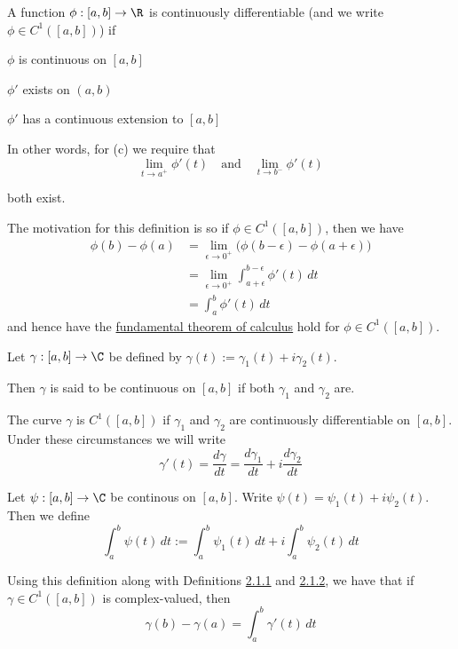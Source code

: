 \label{c1f6d35}

A function $\phi:[a,b]\to\R$ is continuously differentiable
(and we write $\phi\in C^1([a,b])$) if

\begin{enumerata}
	\item $\phi$ is continuous on $[a,b]$
	\item $\phi'$ exists on $(a,b)$
	\item $\phi'$ has a continuous extension to $[a,b]$
\end{enumerata}

In other words, for (c) we require that
$$
	\lim_{t\to a^+}\phi'(t)\quad\text{and}\quad\lim_{t\to b^-}\phi'(t)
$$

both exist.

The motivation for this definition is so if $\phi\in C^1([a,b])$, then
we have
\begin{align}
	\phi(b)-\phi(a)
	 & =\lim_{\epsilon\to0^+}\big(\phi(b-\epsilon)-\phi(a+\epsilon)\big) \\
	 & =\lim_{\epsilon\to0^+}\int_{a+\epsilon}^{b-\epsilon}\phi'(t)\,dt  \\
	 & =\int_a^b\phi'(t)\,dt
\end{align}
and hence have the \href{b869dc0}{fundamental theorem of calculus}
hold for $\phi\in C^1([a,b])$.

\label{e4132bc}

Let $\gamma:[a,b]\to\C$ be defined by $\gamma(t):=\gamma_1(t) +
	i\gamma_2(t)$.

Then $\gamma$ is said to be continuous on $[a,b]$ if both $\gamma_1$
and $\gamma_2$ are.

The curve $\gamma$ is $C^1([a,b])$ if $\gamma_1$ and $\gamma_2$ are
continuously differentiable on $[a,b]$. Under these circumstances we
will write
$$
	\gamma'(t)=\frac{d\gamma}{dt}=\frac{d\gamma_1}{dt}+i\frac{d\gamma_2}{dt}
$$

\label{c511702}

Let $\psi:[a,b]\to\C$ be continous on $[a,b]$. Write
$\psi(t)=\psi_1(t)+i\psi_2(t)$. Then we define
$$
	\int_a^b\psi(t)\,dt:=\int_a^b\psi_1(t)\,dt+i\int_a^b\psi_2(t)\,dt
$$

Using this definition along with Definitions \href{c1f6d35}{2.1.1}
and \href{e4132bc}{2.1.2}, we have that if $\gamma\in C^1([a,b])$
is complex-valued, then
$$
	\gamma(b)-\gamma(a)=\int_a^b\gamma'(t)\,dt
$$

